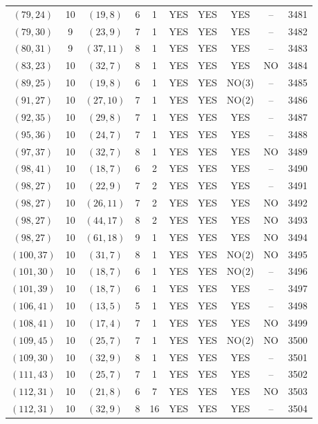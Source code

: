 \begin{longtable}{|c|c|c|c|c|c|c|c|c|c|}
$(79, 24)$ & 10 & $(19, 8)$ & 6 & 1 & YES & YES & YES & -- & 3481\\
$(79, 30)$ & 9 & $(23, 9)$ & 7 & 1 & YES & YES & YES & -- & 3482\\
$(80, 31)$ & 9 & $(37, 11)$ & 8 & 1 & YES & YES & YES & -- & 3483\\
$(83, 23)$ & 10 & $(32, 7)$ & 8 & 1 & YES & YES & YES & NO & 3484\\
$(89, 25)$ & 10 & $(19, 8)$ & 6 & 1 & YES & YES & NO(3) & -- & 3485\\
$(91, 27)$ & 10 & $(27, 10)$ & 7 & 1 & YES & YES & NO(2) & -- & 3486\\
$(92, 35)$ & 10 & $(29, 8)$ & 7 & 1 & YES & YES & YES & -- & 3487\\
$(95, 36)$ & 10 & $(24, 7)$ & 7 & 1 & YES & YES & YES & -- & 3488\\
$(97, 37)$ & 10 & $(32, 7)$ & 8 & 1 & YES & YES & YES & NO & 3489\\
$(98, 41)$ & 10 & $(18, 7)$ & 6 & 2 & YES & YES & YES & -- & 3490\\
$(98, 27)$ & 10 & $(22, 9)$ & 7 & 2 & YES & YES & YES & -- & 3491\\
$(98, 27)$ & 10 & $(26, 11)$ & 7 & 2 & YES & YES & YES & NO & 3492\\
$(98, 27)$ & 10 & $(44, 17)$ & 8 & 2 & YES & YES & YES & NO & 3493\\
$(98, 27)$ & 10 & $(61, 18)$ & 9 & 1 & YES & YES & YES & NO & 3494\\
$(100, 37)$ & 10 & $(31, 7)$ & 8 & 1 & YES & YES & NO(2) & NO & 3495\\
$(101, 30)$ & 10 & $(18, 7)$ & 6 & 1 & YES & YES & NO(2) & -- & 3496\\
$(101, 39)$ & 10 & $(18, 7)$ & 6 & 1 & YES & YES & YES & -- & 3497\\
$(106, 41)$ & 10 & $(13, 5)$ & 5 & 1 & YES & YES & YES & -- & 3498\\
$(108, 41)$ & 10 & $(17, 4)$ & 7 & 1 & YES & YES & YES & NO & 3499\\
$(109, 45)$ & 10 & $(25, 7)$ & 7 & 1 & YES & YES & NO(2) & NO & 3500\\
$(109, 30)$ & 10 & $(32, 9)$ & 8 & 1 & YES & YES & YES & -- & 3501\\
$(111, 43)$ & 10 & $(25, 7)$ & 7 & 1 & YES & YES & YES & -- & 3502\\
$(112, 31)$ & 10 & $(21, 8)$ & 6 & 7 & YES & YES & YES & NO & 3503\\
$(112, 31)$ & 10 & $(32, 9)$ & 8 & 16 & YES & YES & YES & -- & 3504\\

\end{longtable}
